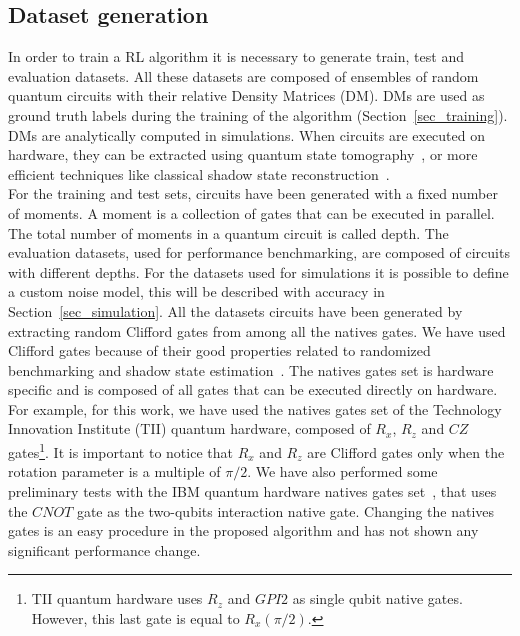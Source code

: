 \documentclass[referee,sn-basic]{sn-jnl} %
\begin{document}
\subsection{Dataset generation}\label{sec_dataset}
In order to train a RL algorithm it is necessary to generate train, test and evaluation datasets.
All these datasets are composed of ensembles of random quantum circuits with their relative Density Matrices (DM). DMs are used as ground truth labels during the training of the algorithm (Section~\ref{sec_training}). DMs are analytically computed in simulations.  When circuits are executed on hardware, they can be extracted using quantum state tomography~\cite{PhysRevLett.109.120403}, or more efficient techniques like classical shadow state reconstruction~\cite{PRXQuantum.2.010307, Eisert_2020, PRXQuantum.2.030348}.\\ 
For the training and test sets, circuits have been generated with a fixed number of moments. A moment is a collection of gates that can be executed in parallel. The total number of moments in a quantum circuit is called depth.  The evaluation datasets, used for performance benchmarking, are composed of circuits with different depths. For the datasets used for simulations it is possible to define a custom noise model, this will be described with accuracy in Section~\ref{sec_simulation}. All the datasets circuits have been generated by extracting random Clifford gates from among all the natives gates. We have used Clifford gates because of their good properties related to randomized benchmarking and shadow state estimation~\cite{2019npj, PhysRevA.77.012307, Eisert_2020, PRXQuantum.2.030348}.
The natives gates set is hardware specific and is composed of all gates that can be executed directly on hardware. For example, for this work, we have used the natives gates set of the Technology Innovation Institute (TII) quantum hardware, composed of $R_x$, $R_z$ and $CZ$ gates\footnote{TII quantum hardware uses $R_z$ and $GPI2$ as single qubit native gates. However, this last gate is equal to $R_x(\pi/2)$.}. It is important to notice that $R_x$ and $R_z$ are Clifford gates only when the rotation parameter is a multiple of $\pi/2$. We have also performed some preliminary tests with the IBM quantum hardware natives gates set~\cite{Santos_2016}, that uses the $CNOT$ gate as the two-qubits interaction native gate. Changing the natives gates is an easy procedure in the proposed algorithm and has not shown any significant performance change.\\
\end{document}
